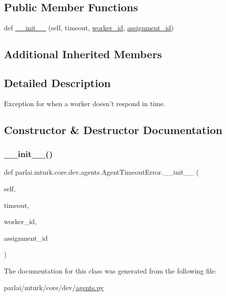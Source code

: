 \subsection*{Public Member Functions}
\begin{DoxyCompactItemize}
\item 
def \hyperlink{classparlai_1_1mturk_1_1core_1_1dev_1_1agents_1_1AgentTimeoutError_a392dd43c67cbfc005555e5bca543cf8b}{\+\_\+\+\_\+init\+\_\+\+\_\+} (self, timeout, \hyperlink{classparlai_1_1mturk_1_1core_1_1dev_1_1agents_1_1AbsentAgentError_a26db50c87a5d4954907d538de3da875c}{worker\+\_\+id}, \hyperlink{classparlai_1_1mturk_1_1core_1_1dev_1_1agents_1_1AbsentAgentError_ab9cf020196d28024b307c41a3fff6be1}{assignment\+\_\+id})
\end{DoxyCompactItemize}
\subsection*{Additional Inherited Members}


\subsection{Detailed Description}
\begin{DoxyVerb}Exception for when a worker doesn't respond in time.
\end{DoxyVerb}
 

\subsection{Constructor \& Destructor Documentation}
\mbox{\label{classparlai_1_1mturk_1_1core_1_1dev_1_1agents_1_1AgentTimeoutError_a392dd43c67cbfc005555e5bca543cf8b}} 
\subsubsection{\texorpdfstring{\+\_\+\+\_\+init\+\_\+\+\_\+()}{\_\_init\_\_()}}
{\footnotesize\ttfamily def parlai.\+mturk.\+core.\+dev.\+agents.\+Agent\+Timeout\+Error.\+\_\+\+\_\+init\+\_\+\+\_\+ (\begin{DoxyParamCaption}\item[{}]{self,  }\item[{}]{timeout,  }\item[{}]{worker\+\_\+id,  }\item[{}]{assignment\+\_\+id }\end{DoxyParamCaption})}



The documentation for this class was generated from the following file\+:\begin{DoxyCompactItemize}
\item 
parlai/mturk/core/dev/\hyperlink{parlai_2mturk_2core_2dev_2agents_8py}{agents.\+py}\end{DoxyCompactItemize}
